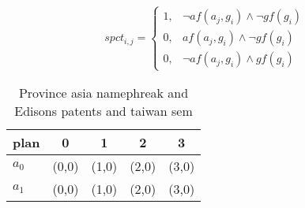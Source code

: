 \documentclass[a4paper]{article}
\begin{document}
\begin{equation}
spct_{i,j} =
\begin{cases}
1, & \text{$\neg af(a_j,g_i) \wedge \neg gf(g_i)$}\\
0, & \text{$af(a_j,g_i) \wedge \neg gf(g_i)$}\\
0, & \text{$\neg af(a_j,g_i) \wedge gf(g_i)$}
\end{cases}
\end{equation}

\begin{table}
\begin{adjustbox}{width=0.6\columnwidth}
\begin{tabular}{|l|l|l|l|l|}
\hline
\textbf{plan} & \multicolumn{1}{c|}{\textbf{0}} & \multicolumn{1}{c|}{\textbf{1}} & \multicolumn{1}{c|}{\textbf{2}} & \multicolumn{1}{c|}{\textbf{3}} \\ \hline
\textbf{$a_0$}  & (0,0) & (1,0) & (2,0) & (3,0) \\ \hline
\textbf{$a_1$}  & (0,0) & (1,0) & (2,0) & (3,0) \\ \hline
\end{tabular}
\end{adjustbox}
\caption{Province asia namephreak and Edisons patents and taiwan sem
}
\end{table}
\end{document}

